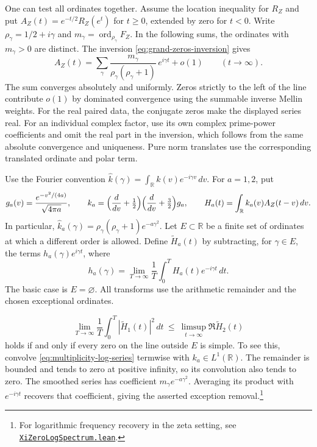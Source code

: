 \documentclass[11pt]{amsart}
\theoremstyle{definition}
\theoremstyle{remark}
\numberwithin{equation}{section}
\begin{document}
One can test all ordinates together. Assume the location inequality for
\(R_Z\) and put \(A_Z(t)=e^{-t/2}R_Z(e^t)\) for \(t\ge0\), extended by
zero for \(t<0\). Write \(\rho_\gamma=1/2+i\gamma\) and
\(m_\gamma=\operatorname{ord}_{\rho_\gamma}F_Z\). In the following sums,
the ordinates with \(m_\gamma>0\) are distinct. The inversion
\eqref{eq:grand-zeros-inversion} gives
\begin{equation}
 A_Z(t)=
 \sum_{\gamma}
 \frac{m_\gamma}{\rho_\gamma(\rho_\gamma+1)}\,e^{i\gamma t}
 +o(1)\qquad(t\to\infty).
 \label{eq:multiplicity-log-series}
\end{equation}
The sum converges absolutely and uniformly. Zeros strictly to the
left of the line contribute \(o(1)\) by dominated convergence using
the summable inverse Mellin weights. For the real paired data, the
conjugate zeros make the displayed series real. For an individual
complex factor, use its own complex prime-power coefficients and
omit the real part in the inversion, which follows from the same
absolute convergence and uniqueness. Pure norm translates use
the corresponding translated ordinate and polar term.

Use the Fourier convention
\(\widehat k(\gamma)=\int_{\mathbb R}k(v)e^{-i\gamma v}\,dv\).
For \(a=1,2\), put
\[
 g_a(v)=\frac{e^{-v^2/(4a)}}{\sqrt{4\pi a}},\qquad
 k_a=\Bigl(\frac{d}{dv}+\tfrac12\Bigr)
     \Bigl(\frac{d}{dv}+\tfrac32\Bigr)g_a,\qquad
 H_a(t)=\int_{\mathbb R}k_a(v)A_Z(t-v)\,dv .
\]
In particular, \(\widehat k_a(\gamma)=
\rho_\gamma(\rho_\gamma+1)e^{-a\gamma^2}\).
Let \(E\subset\mathbb R\) be a finite set of ordinates at which a
different order is allowed. Define \(\widetilde H_a(t)\) by subtracting,
for \(\gamma\in E\), the terms \(h_a(\gamma)e^{i\gamma t}\), where
\[
 h_a(\gamma)=\lim_{T\to\infty}\frac1T
               \int_0^T H_a(t)e^{-i\gamma t}\,dt .
\]
The basic case is \(E=\varnothing\). All transforms
use the arithmetic remainder and the chosen exceptional ordinates.

\begin{equation}
 \lim_{T\to\infty}\frac1T\int_0^T|\widetilde H_1(t)|^2\,dt
 \ \le\ \limsup_{t\to\infty}\Re\widetilde H_2(t)
 \label{eq:global-multiplicity-energy}
\end{equation}
holds if and only if every zero on the line outside \(E\) is simple.
To see this, convolve \eqref{eq:multiplicity-log-series} termwise
with \(k_a\in L^1(\mathbb R)\). The remainder is bounded and tends
to zero at positive infinity, so its convolution also tends to zero.
The smoothed series has coefficient
\(m_\gamma e^{-a\gamma^2}\). Averaging its product with
\(e^{-i\gamma t}\) recovers that coefficient, giving the asserted
exception removal.\footnote{For logarithmic frequency recovery in the
zeta setting, see
\href{https://github.com/kimihiro64/prime-factor-oscillations/blob/5aa03e03423b7f9cee75f31798e9d68dde8c5dbf/PrimeFactorOscillations/Helpers/XiZeroLogSpectrum.lean}{\texttt{XiZeroLogSpectrum.lean}}.}
\end{document}
